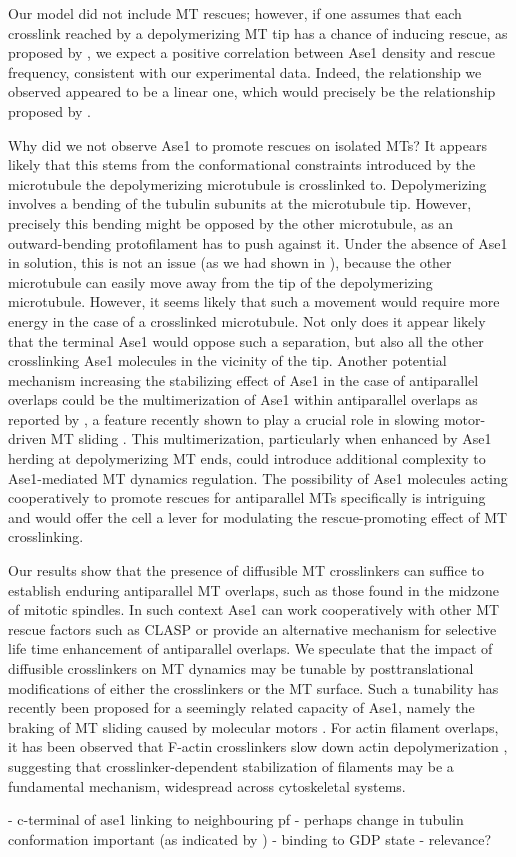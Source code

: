Our model did not include MT rescues; however, if one assumes that each crosslink reached by a depolymerizing MT tip has a chance of inducing rescue, as proposed by \cite{Stoppin-Mellet2013}, we expect a positive correlation between Ase1 density and rescue frequency, consistent with our experimental data. Indeed, the relationship we observed appeared to be a linear one, which would precisely be the relationship proposed by \cite{Stoppin-Mellet2013}.\par 

Why did we not observe Ase1 to promote rescues on isolated MTs? It appears likely that this stems from the conformational constraints introduced by the microtubule the depolymerizing microtubule is crosslinked to. Depolymerizing involves a bending of the tubulin subunits at the microtubule tip. However, precisely this bending might be opposed by the other microtubule, as an outward-bending protofilament has to push against it. Under the absence of Ase1 in solution, this is not an issue (as we had shown in ), because the other microtubule can easily move away from the tip of the depolymerizing microtubule. However, it seems likely that such a movement would require more energy in the case of a crosslinked microtubule. Not only does it appear likely that the terminal Ase1 would oppose such a separation, but also all the other crosslinking Ase1 molecules in the vicinity of the tip. Another potential mechanism increasing the stabilizing effect of Ase1 in the case of antiparallel overlaps could be the multimerization of Ase1 within antiparallel overlaps as reported by \cite{Kapitein2008}, a feature recently shown to play a crucial role in slowing motor-driven MT sliding \parencite{alfieri2021two}. This multimerization, particularly when enhanced by Ase1 herding at depolymerizing MT ends, could introduce additional complexity to Ase1-mediated MT dynamics regulation. The possibility of Ase1 molecules acting cooperatively to promote rescues for antiparallel MTs specifically is intriguing and would offer the cell a lever for modulating the rescue-promoting effect of MT crosslinking. \par
 
Our results show that the presence of diffusible MT crosslinkers can suffice to establish enduring antiparallel MT overlaps, such as those found in the midzone of mitotic spindles. In such context Ase1 can work cooperatively with other MT rescue factors such as CLASP \parencite{Bratman2007b} or provide an alternative mechanism for selective life time enhancement of antiparallel overlaps. We speculate that the impact of diffusible crosslinkers on MT dynamics may be tunable by posttranslational modifications of either the crosslinkers or the MT surface. Such a tunability has recently been proposed for a seemingly related capacity of Ase1, namely the braking of MT sliding caused by molecular motors \parencite{fu2009phospho, Thomas2020}. For actin filament overlaps, it has been observed that F-actin crosslinkers slow down actin depolymerization \parencite{maul2003eplin,schmoller2011slow}, suggesting that crosslinker-dependent stabilization of filaments may be a fundamental mechanism, widespread across cytoskeletal systems.


- c-terminal of ase1 linking to neighbouring pf 
- perhaps change in tubulin conformation important (as indicated by )
- binding to GDP state - relevance?